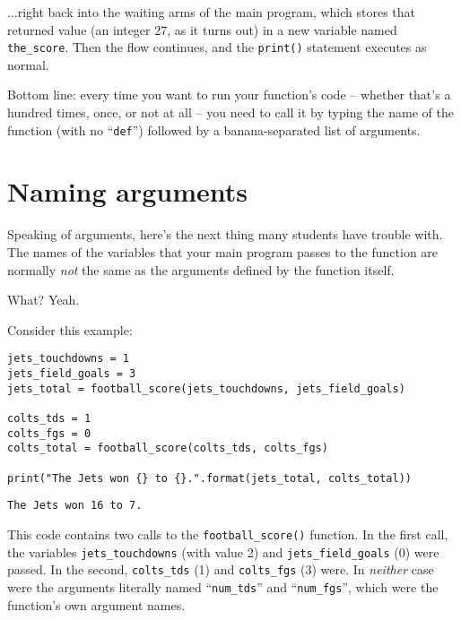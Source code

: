 ...right back into the waiting arms of the main program, which stores that
returned value (an integer 27, as it turns out) in a new variable named
\texttt{the\_score}. Then the flow continues, and the \texttt{print()}
statement executes as normal.

Bottom line: every time you want to run your function's code -- whether that's
a hundred times, once, or not at all -- you need to call it by typing the name
of the function (with no ``\texttt{def}'') followed by a banana-separated list
of arguments.

\section{Naming arguments}


Speaking of arguments, here's the next thing many students have trouble with.
The names of the variables that your main program passes to the function are
normally \textit{not} the same as the arguments defined by the function itself.

What? Yeah.

Consider this example:


\begin{Verbatim}[fontsize=\footnotesize,samepage=true,frame=single,framesep=3mm]
jets_touchdowns = 1
jets_field_goals = 3
jets_total = football_score(jets_touchdowns, jets_field_goals)

colts_tds = 1
colts_fgs = 0
colts_total = football_score(colts_tds, colts_fgs)

print("The Jets won {} to {}.".format(jets_total, colts_total))
\end{Verbatim}
\vspace{-.2in}

\begin{Verbatim}[fontsize=\small,samepage=true,frame=leftline,framesep=5mm,framerule=1mm]
The Jets won 16 to 7.
\end{Verbatim}

This code contains two calls to the \texttt{football\_score()} function. In the
first call, the variables \texttt{jets\_touchdowns} (with value 2) and
\texttt{jets\_field\_goals} (0) were passed. In the second,
\texttt{colts\_tds} (1) and \texttt{colts\_fgs} (3) were. In
\textit{neither} case were the arguments literally named ``\texttt{num\_tds}''
and ``\texttt{num\_fgs}'', which were the function's own argument names.

